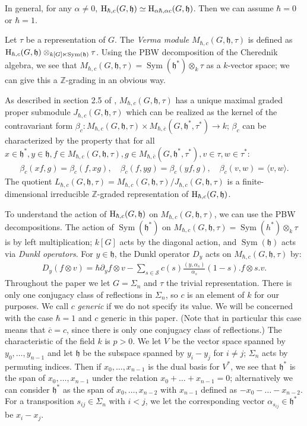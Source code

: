 \documentclass{article}
\numberwithin{equation}{section}
\newcommand{\h}{\mathfrak{h}}
\newcommand{\HH}{{\rm H}}
\newcommand{\Sym}{\operatorname{Sym}}
\begin{document}
In general, for any $\alpha \ne 0$, $\HH_{\hbar,c}(G,\h)\simeq \HH_{\alpha\hbar,\alpha c}(G,\h)$. Then we can assume $\hbar=0$ or $\hbar = 1$. 

Let $\tau$ be a representation of $G$. The {\it Verma module} $M_{\hbar,c}(G,\h,\tau)$ is defined as $\HH_{\hbar,c}(G,\h) \otimes_{k[G] \ltimes \Sym(\h)} \tau$. Using the PBW decomposition of the Cherednik algebra, we see that $M_{\hbar,c}(G,\h,\tau)=\Sym(\h^*) \otimes_k \tau$ as a $k$-vector space; we can give this a $\mathbb{Z}$-grading in an obvious way. 

As described in section 2.5 of \cite{BC1}, $M_{\hbar,c}(G,\h,\tau)$ has a unique maximal graded proper submodule $J_{\hbar,c}(G,\h,\tau)$ which can be realized as the kernel of the contravariant form $\beta_c: M_{\hbar,c}(G,\h,\tau) \times M_{\hbar,\overline{c}}(G,\h^*,\tau^*) \to k$; $\beta_c$ can be characterized by the property that for all $x \in \h^*, y \in \h, f \in M_{\hbar,c}(G,\h,\tau), g \in  M_{\hbar,\overline{c}}(G,\h^*,\tau^*), v \in \tau, w \in \tau^*$:
\begin{align*}
\beta_c(xf,g)=\beta_c(f,xg), \quad \beta_c(f,yg) = \beta_c(yf,g), \quad \beta_c(v,w) = \langle v,w\rangle.
\end{align*}
The quotient $L_{\hbar,c}(G,\h,\tau) = M_{\hbar,c}(G,\h,\tau)/J_{\hbar,c}(G,\h,\tau)$ is a finite-dimensional irreducible $\mathbb{Z}$-graded representation of $\HH_{\hbar,c}(G,\h)$.

To understand the action of $\HH_{\hbar,c}(G,\h)$ on $M_{\hbar,c}(G,\h,\tau)$, we can use the PBW decompositions. The action of $\Sym(\h^*)$ on $M_{\hbar,c}(G,\h,\tau)=\Sym(h^*)\otimes_k \tau$ is by left multiplication; $k[G]$ acts by the diagonal action, and $\Sym(\h)$ acts via {\it Dunkl operators}. For $y \in \h$, the Dunkl operator $D_y$ acts on $M_{\hbar,c}(G,\h,\tau)$ by:
\begin{align*}
D_y(f \otimes v) = \hbar \partial_y f \otimes v - \sum_{s \in \mathcal{S}} c(s) \frac{ ( y, \alpha_s )}{\alpha_s} (1-s). f \otimes s.v.
\end{align*}
Throughout the paper we let $G=\Sigma_n$ and $\tau$ the trivial representation. There is only one conjugacy class of reflections in $\Sigma_n$, so $c$ is an element of $k$ for our purposes. We call $c$ {\it generic} if we do not specify its value. We will be concerned with the case $\hbar=1$ and $c$ generic in this paper. (Note that in particular this case means that $\overline{c}=c$, since there is only one conjugacy class of reflections.) The characteristic of the field $k$ is $p>0$. We let $V$ be the vector space spanned by $y_0,\dots,y_{n-1}$ and let $\h$ be the subspace spanned by $y_i-y_j$ for $i \ne j$; $\Sigma_n$ acts by permuting indices. Then if $x_0,\dots,x_{n-1}$ is the dual basis for $V^*$, we see that $\h^*$ is the span of $x_0,\dots,x_{n-1}$ under the relation $x_0+\dots+x_{n-1}=0$; alternatively we can consider $\h^*$ as the span of $x_0,\dots,x_{n-2}$ with $x_{n-1}$ defined as $-x_0-\dots-x_{n-2}$. For a transposition $s_{ij} \in \Sigma_n$ with $i<j$, we let the corresponding vector $\alpha_{s_{ij}} \in \h^*$ be $x_i-x_j$.
\end{document}
